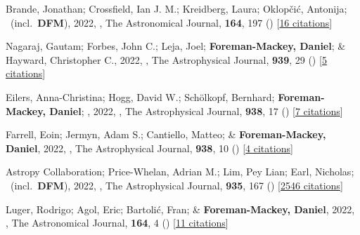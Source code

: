 \item[{\color{numcolor}\scriptsize89}] Brande, Jonathan; Crossfield, Ian J. M.; Kreidberg, Laura; Oklop{\v{c}}i{\'c}, Antonija; \etal\ (incl.\ \textbf{DFM}), 2022, , The Astronomical Journal, \textbf{164}, 197 () [\href{https://ui.adsabs.harvard.edu/abs/2022AJ....164..197B}{16 citations}]

\item[{\color{numcolor}\scriptsize88}] Nagaraj, Gautam; Forbes, John C.; Leja, Joel; \textbf{Foreman-Mackey, Daniel}; \& Hayward, Christopher C., 2022, , The Astrophysical Journal, \textbf{939}, 29 () [\href{https://ui.adsabs.harvard.edu/abs/2022ApJ...939...29N}{5 citations}]

\item[{\color{numcolor}\scriptsize87}] Eilers, Anna-Christina; Hogg, David W.; Sch{\"o}lkopf, Bernhard; \textbf{Foreman-Mackey, Daniel}; \etal, 2022, , The Astrophysical Journal, \textbf{938}, 17 () [\href{https://ui.adsabs.harvard.edu/abs/2022ApJ...938...17E}{7 citations}]

\item[{\color{numcolor}\scriptsize86}] Farrell, Eoin; Jermyn, Adam S.; Cantiello, Matteo; \& \textbf{Foreman-Mackey, Daniel}, 2022, , The Astrophysical Journal, \textbf{938}, 10 () [\href{https://ui.adsabs.harvard.edu/abs/2022ApJ...938...10F}{4 citations}]

\item[{\color{numcolor}\scriptsize85}] Astropy Collaboration; Price-Whelan, Adrian M.; Lim, Pey Lian; Earl, Nicholas; \etal\ (incl.\ \textbf{DFM}), 2022, , The Astrophysical Journal, \textbf{935}, 167 () [\href{https://ui.adsabs.harvard.edu/abs/2022ApJ...935..167A}{2546 citations}]

\item[{\color{numcolor}\scriptsize84}] Luger, Rodrigo; Agol, Eric; Bartoli{\'c}, Fran; \& \textbf{Foreman-Mackey, Daniel}, 2022, , The Astronomical Journal, \textbf{164}, 4 () [\href{https://ui.adsabs.harvard.edu/abs/2022AJ....164....4L}{11 citations}]


